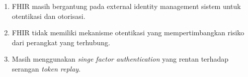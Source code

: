 \begin{enumerate}
    \item FHIR masih bergantung pada external identity management sistem untuk otentikasi dan otorisasi.
    \item FHIR tidak memiliki mekanisme otentikasi yang mempertimbangkan risiko dari perangkat yang terhubung.
    \item Masih menggunakan \textit{singe factor authentication} yang rentan terhadap serangan \textit{token replay}.
\end{enumerate}